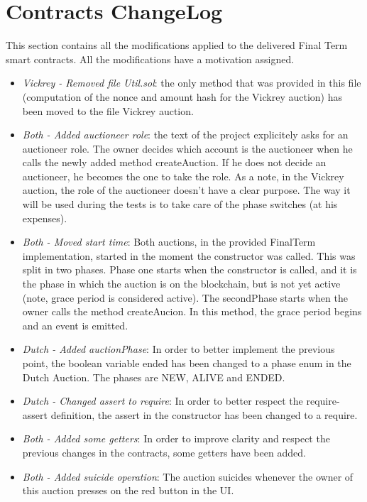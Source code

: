 \documentclass[11pt, a4paper]{report}
\begin{document}
\section*{Contracts ChangeLog}
This section contains all the modifications applied to the delivered Final Term smart contracts. All the modifications have a motivation assigned.
\begin{itemize}
	\item \emph{Vickrey - Removed file Util.sol}: the only method that was provided in this file (computation of the nonce and amount hash for the Vickrey auction) has been moved to the file Vickrey auction. 
	\item \emph{Both - Added auctioneer role}: the text of the project explicitely asks for an auctioneer role. The owner decides which account is the auctioneer when he calls the newly added method createAuction. If he does not decide an auctioneer, he becomes the one to take the role. As a note, in the Vickrey auction, the role of the auctioneer doesn't have a clear purpose. The way it will be used during the tests is to take care of the phase switches (at his expenses).
	\item \emph{Both - Moved start time}: Both auctions, in the provided FinalTerm implementation, started in the moment the constructor was called. This was split in two phases. Phase one starts when the constructor is called, and it is the phase in which the auction is on the blockchain, but is not yet active (note, grace period is considered active). The secondPhase starts when the owner calls the method createAucion. In this method, the grace period begins and an event is emitted.
	\item \emph{Dutch - Added auctionPhase}: In order to better implement the previous point, the boolean variable ended has been changed to a phase enum in the Dutch Auction. The phases are NEW, ALIVE and ENDED.
	\item \emph{Dutch - Changed assert to require}: In order to better respect the require-assert definition, the assert in the constructor has been changed to a require.
	\item \emph{Both - Added some getters}: In order to improve clarity and respect the previous changes in the contracts, some getters have been added.
	\item \emph{Both - Added suicide operation}: The auction suicides whenever the owner of this auction presses on the red button in the UI.
\end{itemize}
\end{document}
